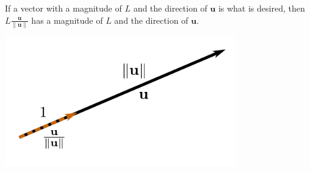 \documentclass{article}
\begin{document}
\vspace{5mm}

If a vector with a magnitude of \(L\) and the direction of \(\mathbf{u}\) is what is desired, then \(L\frac{\mathbf{u}}{\|\mathbf{u}\|}\) has a magnitude of \(L\) and the direction of \(\mathbf{u}\). 

\begin{center}
\includegraphics[width = 0.75\textwidth]{displacement_vector_normalization}
\end{center}
\end{document}
